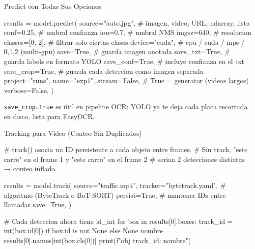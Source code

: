 \documentclass[aspectratio=169, 11pt]{beamer}
\begin{document}
\begin{frame}{Predict con Todas Sus Opciones}
  \vspace{-4pt}
  \begin{pyblock}
results = model.predict(
    source="auto.jpg",        # imagen, video, URL, ndarray, lista
    conf=0.25,                # umbral confianza
    iou=0.7,                  # umbral NMS
    imgsz=640,                # resolucion
    classes=[0, 2],           # filtrar solo ciertas clases
    device="cuda",            # cpu / cuda / mps / 0,1,2 (multi-gpu)
    save=True,                # guarda imagen anotada
    save_txt=True,            # guarda labels en formato YOLO
    save_conf=True,           # incluye confianza en el txt
    save_crop=True,           # guarda cada deteccion como imagen separada
    project="runs", name="exp1",
    stream=False,             # True = generator (videos largos)
    verbose=False,
)
  \end{pyblock}

  \vspace{4pt}
  {\scriptsize\color{textMuted}
    \faLightbulb\hspace{4pt} \texttt{save\_crop=True} es \'util en pipeline OCR:
    YOLO ya te deja cada placa recortada en disco, lista para EasyOCR.}
\end{frame}

\begin{frame}{Tracking para Video (Conteo Sin Duplicados)}
  \vspace{-4pt}
  \begin{pyblock}
# track() asocia un ID persistente a cada objeto entre frames.
# Sin track, "este carro" en el frame 1 y "este carro" en el frame 2
# serian 2 detecciones distintas → conteo inflado.

results = model.track(
    source="traffic.mp4",
    tracker="bytetrack.yaml",   # algoritmo (ByteTrack o BoT-SORT)
    persist=True,               # mantener IDs entre llamadas
    save=True,
)

# Cada deteccion ahora tiene id_int
for box in results[0].boxes:
    track_id = int(box.id[0]) if box.id is not None else None
    nombre = results[0].names[int(box.cls[0])]
    print(f"obj {track_id}: {nombre}")
  \end{pyblock}
\end{frame}
\end{document}
